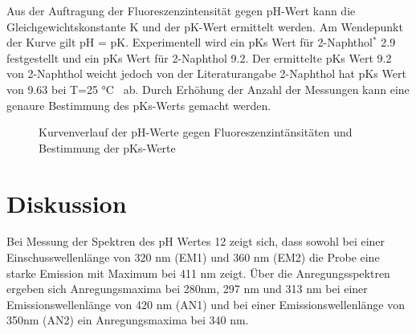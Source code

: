 \documentclass[12pt]{article}
\begin{document}
Aus der Auftragung der Fluoreszenzintensität gegen pH-Wert kann die Gleichgewichtskonstante K und der
pK-Wert ermittelt werden. Am Wendepunkt der Kurve gilt pH = pK.
Experimentell wird ein pKs Wert für 2-Naphthol$^*$ 2.9 festgestellt und ein pKs Wert für 2-Naphthol 9.2.
Der ermittelte pKs Wert 9.2 von 2-Naphthol weicht jedoch von der Literaturangabe
2-Naphthol hat pKs Wert von 9.63 bei T=25 \si{\celsius}~\supercite{crc} ab. Durch Erhöhung der Anzahl der Messungen kann
eine genaure Bestimmung des pKs-Werts gemacht werden.
\begin{figure}[!htbp]
\caption{Kurvenverlauf der pH-Werte gegen Fluoreszenzintänsitäten und Bestimmung der pKs-Werte}
\end{figure}


\section{Diskussion}

Bei Messung der Spektren des pH Wertes 12 zeigt sich, dass sowohl bei einer Einschusswellenlänge von 320 nm (EM1) und
360 nm (EM2) die Probe eine starke Emission mit Maximum bei 411 nm zeigt. Über die Anregungsspektren
 ergeben sich Anregungsmaxima bei 280nm, 297 nm und 313 nm bei einer Emissionswellenlänge von 420 nm (AN1)
 und bei einer Emissionswellenlänge von 350nm (AN2) ein Anregungsmaxima bei 340 nm.
\end{document}
